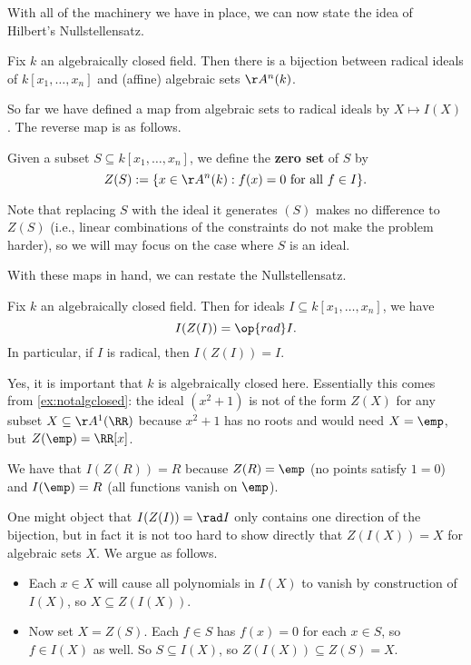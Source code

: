 With all of the machinery we have in place, we can now state the idea of Hilbert's Nullstellensatz.
\begin{theorem}[Nullstellensatz, I]
	Fix $k$ an algebraically closed field. Then there is a bijection between radical ideals of $k[x_1,\ldots,x_n]$ and (affine) algebraic sets $\AA^n(k)$.
\end{theorem}
So far we have defined a map from algebraic sets to radical ideals by $X\mapsto I(X)$. The reverse map is as follows.
\begin{definition}[\texorpdfstring{$Z(I)$}{Z(I)}]
	Given a subset $S\subseteq k[x_1,\ldots,x_n]$, we define the \textbf{zero set} of $S$ by
	\[Z(S):=\{x\in\AA^n(k):f(x)=0\text{ for all }f\in I\}.\]
\end{definition}
Note that replacing $S$ with the ideal it generates $(S)$ makes no difference to $Z(S)$ (i.e., linear combinations of the constraints do not make the problem harder), so we will may focus on the case where $S$ is an ideal.

With these maps in hand, we can restate the Nullstellensatz.
\begin{theorem}[Nullstellensatz, II]
	Fix $k$ an algebraically closed field. Then for ideals $I\subseteq k[x_1,\ldots,x_n]$, we have
	\[I(Z(I))=\op{rad}I.\]
	In particular, if $I$ is radical, then $I(Z(I))=I$.
\end{theorem}
\begin{remark}
	Yes, it is important that $k$ is algebraically closed here. Essentially this comes from \autoref{ex:notalgclosed}: the ideal $\left(x^2+1\right)$ is not of the form $Z(X)$ for any subset $X\subseteq\AA^1(\RR)$ because $x^2+1$ has no roots and would need $X=\emp$, but $Z(\emp)=\RR[x]$.
\end{remark}
\begin{example}
	We have that $I(Z(R))=R$ because $Z(R)=\emp$ (no points satisfy $1=0$) and $I(\emp)=R$ (all functions vanish on $\emp$).
\end{example}
\begin{remark}[Nir] \label{rem:othernullstellensatz}
	One might object that $I(Z(I))=\rad I$ only contains one direction of the bijection, but in fact it is not too hard to show directly that $Z(I(X))=X$ for algebraic sets $X$. We argue as follows.
	\begin{itemize}
		\item Each $x\in X$ will cause all polynomials in $I(X)$ to vanish by construction of $I(X)$, so $X\subseteq Z(I(X))$.
		\item Now set $X=Z(S)$. Each $f\in S$ has $f(x)=0$ for each $x\in S$, so $f\in I(X)$ as well. So $S\subseteq I(X)$, so $Z(I(X))\subseteq Z(S)=X$.
	\end{itemize}
\end{remark}

